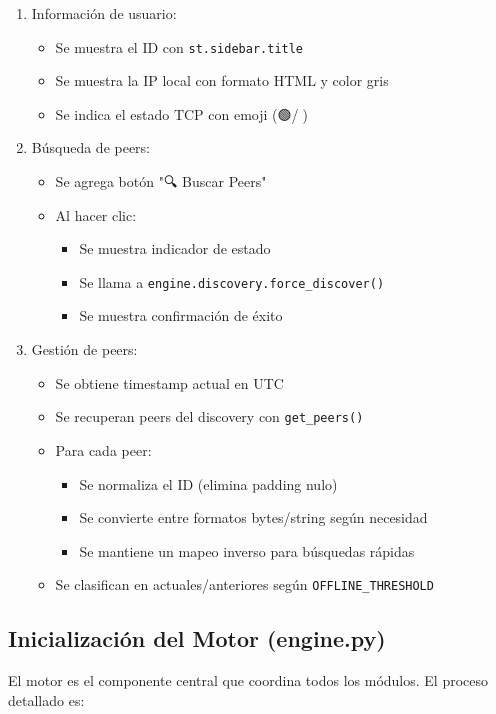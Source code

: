 \documentclass[12pt]{article}
\begin{document}
\begin{enumerate}
    \item Información de usuario:
    \begin{itemize}
        \item Se muestra el ID con \texttt{st.sidebar.title}
        \item Se muestra la IP local con formato HTML y color gris
        \item Se indica el estado TCP con emoji (🟢/🔴)
    \end{itemize}

    \item Búsqueda de peers:
    \begin{itemize}
        \item Se agrega botón "🔍 Buscar Peers"
        \item Al hacer clic:
        \begin{itemize}
            \item Se muestra indicador de estado
            \item Se llama a \texttt{engine.discovery.force\_discover()}
            \item Se muestra confirmación de éxito
        \end{itemize}
    \end{itemize}

    \item Gestión de peers:
    \begin{itemize}
        \item Se obtiene timestamp actual en UTC
        \item Se recuperan peers del discovery con \texttt{get\_peers()}
        \item Para cada peer:
        \begin{itemize}
            \item Se normaliza el ID (elimina padding nulo)
            \item Se convierte entre formatos bytes/string según necesidad
            \item Se mantiene un mapeo inverso para búsquedas rápidas
        \end{itemize}
        \item Se clasifican en actuales/anteriores según \texttt{OFFLINE\_THRESHOLD}
    \end{itemize}
\end{enumerate}

\subsection{Inicialización del Motor (engine.py)}
El motor es el componente central que coordina todos los módulos. El proceso detallado es:
\end{document}
